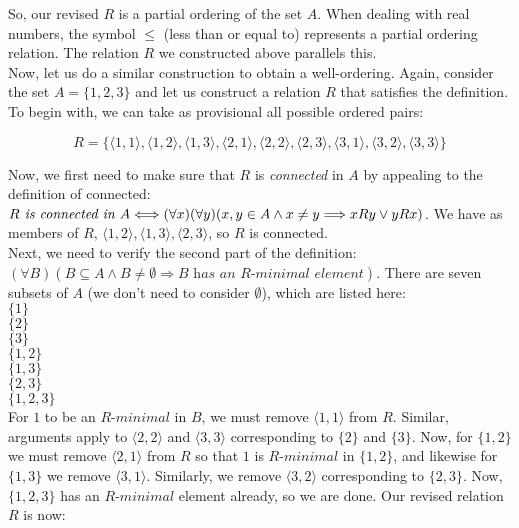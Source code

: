 So, our revised $R$ is a partial ordering of the set $A$.  When dealing with real numbers, the symbol $\le$ (less than or equal to) represents a partial ordering relation.  The relation $R$ we constructed above parallels this.\\

Now, let us do a similar construction to obtain a well-ordering.  Again, consider the set $A=\{1,2,3\}$ and let us construct a relation $R$ that satisfies the definition.  To begin with, we can take as provisional all possible ordered pairs:

\begin{displaymath}
R=\{\langle 1,1 \rangle, \langle 1,2 \rangle, \langle 1,3 \rangle, 
\langle 2,1 \rangle,\langle 2,2 \rangle,\langle 2,3 \rangle, 
\langle 3,1 \rangle,\langle 3,2 \rangle,\langle 3,3 \rangle\}
\end{displaymath}

Now, we first need to make sure that $R$ is \textit{connected} in $A$ by appealing to the definition of connected: $R \textit{ is connected in }\index{connected} A \Longleftrightarrow (\forall x)(\forall y)(x,y \in A \land x \ne y \Longrightarrow x R y \lor y  R x)$.  We have as members of $R$, $\langle 1,2 \rangle, \langle 1,3 \rangle, \langle 2,3 \rangle$, so $R$ is connected.\\

Next, we need to verify the second part of the definition: $(\forall B)(B \subseteq A \land B \ne \emptyset \Longrightarrow B \textit{ has an }R \textit{-minimal element})$.  There are seven subsets of $A$ (we don't need to consider $\emptyset$), which are listed here:\\
$\{1\}$\\
$\{2\}$\\
$\{3\}$\\
$\{1,2\}$\\
$\{1,3\}$\\
$\{2,3\}$\\
$\{1,2,3\}$\\

For $1$ to be an $R\textit{-minimal}$ in $B$, we must remove $\langle 1,1 \rangle$ from $R$.  Similar, arguments apply to $\langle 2,2 \rangle$ and $\langle 3,3 \rangle$ corresponding to $\{2\}$ and $\{3\}$.  Now, for $\{1,2\}$ we must remove $\langle 2,1 \rangle $ from $R$ so that $1$ is $R\textit{-minimal}$ in $\{1,2\}$, and likewise for $\{1,3\}$ we remove $\langle 3,1 \rangle $.  Similarly, we remove $\langle 3,2 \rangle$ corresponding to $\{2,3\}$.  Now, $\{1,2,3\}$ has an $R\textit{-minimal}$ element already, so we are done.  Our revised relation $R$ is now:

